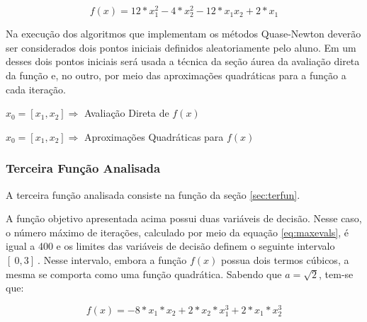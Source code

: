     \begin{equation*} 
        f(x) = 12*x_1^2 - 4*x_2^2 - 12*x_1x_2 + 2*x_1
    \end{equation*}
    
    Na execução dos algoritmos que implementam os métodos Quase-Newton deverão ser considerados dois pontos iniciais definidos aleatoriamente pelo aluno. Em um desses dois pontos iniciais será usada a técnica da seção áurea da avaliação direta da função e, no outro, por meio das aproximações quadráticas para a função a cada iteração. 

        \begin{minipage}{\linewidth}
            \centering
            $x_0=[x_1,x_2]\Longrightarrow$  Avaliação Direta de $f(x)$
            \label{tab:tble} 
            \writetable{\tble}
            \bigskip
        \end{minipage}
        
        \begin{minipage}{\linewidth}
            \centering
            $x_0=[x_1,x_2]\Longrightarrow$  Aproximações Quadráticas para $f(x)$
            \label{tab:tblf} 
            \writetable{\tblf}
            \bigskip
        \end{minipage}
    
    \subsubsection{Terceira Função Analisada}

    A terceira função analisada consiste na função da seção \ref{sec:terfun}.
    
    A função objetivo apresentada acima possui duas variáveis de decisão. Nesse caso, o número máximo de iterações, calculado por meio da equação \ref{eq:maxevals}, é igual a 400 e os limites das variáveis de decisão definem o seguinte intervalo $[\ 0 , 3 ]\ $. Nesse intervalo, embora a função $f(x)$ possua dois termos cúbicos, a mesma se comporta como uma função quadrática. Sabendo que $a=\sqrt{2}$, tem-se que:

    \begin{equation*} 
        f(x) = -8*x_1*x_2+2*x_2*x_1^3+2*x_1*x_2^3
    \end{equation*}

